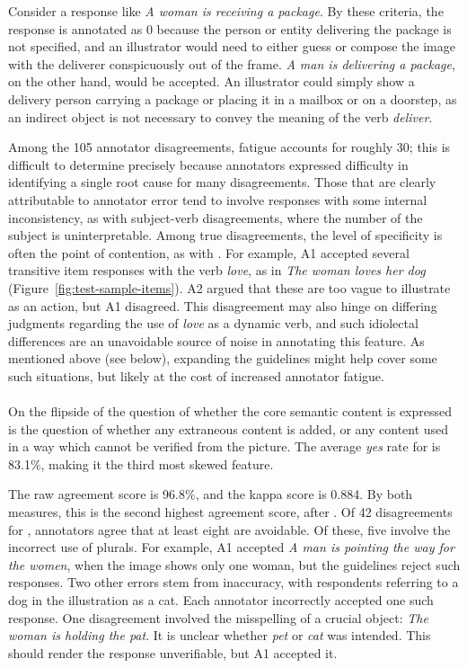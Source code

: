 Consider a response like \textit{A woman is receiving a package}.  By these criteria, the response is annotated as 0 because the person or entity delivering the package is not specified, and an illustrator would need to either guess or compose the image with the deliverer conspicuously out of the frame. \textit{A man is delivering a package}, on the other hand, would be accepted. An illustrator could simply show a delivery person carrying a package or placing it in a mailbox or on a doorstep, as an indirect object is not necessary to convey the meaning of the verb \textit{deliver}.

Among the 105 annotator disagreements, fatigue accounts for roughly 30; this is difficult to determine precisely because annotators expressed difficulty in identifying a single root cause for many disagreements. Those that are clearly attributable to annotator error tend to involve responses with some internal inconsistency, as with subject-verb disagreements, where the number of the subject is uninterpretable. Among true disagreements, the level of specificity is often the point of contention, as with . For example, A1 accepted several transitive item responses with the verb \textit{love}, as in \textit{The woman loves her dog} (Figure~\ref{fig:test-sample-items}). A2 argued that these are too vague to illustrate as an action, but A1 disagreed. This disagreement may also hinge on differing judgments regarding the use of \textit{love} as a dynamic verb, and such idiolectal differences are an unavoidable source of noise in annotating this feature. As mentioned above (see  below), expanding the guidelines might help cover some such situations, but likely at the cost of increased annotator fatigue.

\paragraph{} On the flipside of the question of whether the core semantic content is expressed is the question of whether any extraneous content is added, or any content used in a way which cannot be verified from the picture.  The average \textit{yes} rate for  is 83.1\%, making it the third most skewed feature.

The raw agreement score is 96.8\%, and the kappa score is 0.884. By both measures, this is the second highest agreement score, after . Of 42 disagreements for , annotators agree that at least eight are avoidable. Of these, five involve the incorrect use of plurals. For example, A1 accepted \textit{A man is pointing the way for the women}, when the image shows only one woman, but the guidelines reject such responses. Two other errors stem from inaccuracy, with respondents referring to a dog in the illustration as a cat. Each annotator incorrectly accepted one such response. One disagreement involved the misspelling of a crucial object: \textit{The woman is holding the pat}. It is unclear whether \textit{pet} or \textit{cat} was intended. This should render the response unverifiable, but A1 accepted it.

